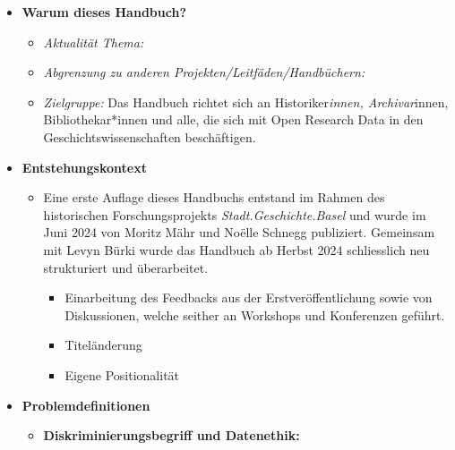 \documentclass[
  letterpaper,
  DIV=11,
  numbers=noendperiod]{scrartcl}
\providecommand{\tightlist}{%
  \setlength{\itemsep}{0pt}\setlength{\parskip}{0pt}}\usepackage{longtable,booktabs,array}
\begin{document}
\begin{itemize}
\item
  \textbf{Warum dieses Handbuch?}

  \begin{itemize}
  \tightlist
  \item
    \emph{Aktualität Thema:}
  \item
    \emph{Abgrenzung zu anderen Projekten/Leitfäden/Handbüchern:}
  \item
    \emph{Zielgruppe:} Das Handbuch richtet sich an
    Historiker\emph{innen, Archivar}innen, Bibliothekar*innen und alle,
    die sich mit Open Research Data in den Geschichtswissenschaften
    beschäftigen.
  \end{itemize}
\item
  \textbf{Entstehungskontext}

  \begin{itemize}
  \tightlist
  \item
    Eine erste Auflage dieses Handbuchs entstand im Rahmen des
    historischen Forschungsprojekts \emph{Stadt.Geschichte.Basel} und
    wurde im Juni 2024 von Moritz Mähr und Noëlle Schnegg publiziert.
    Gemeinsam mit Levyn Bürki wurde das Handbuch ab Herbst 2024
    schliesslich neu strukturiert und überarbeitet.

    \begin{itemize}
    \tightlist
    \item
      Einarbeitung des Feedbacks aus der Erstveröffentlichung sowie von
      Diskussionen, welche seither an Workshops und Konferenzen geführt.
    \item
      Titeländerung
    \item
      Eigene Positionalität
    \end{itemize}
  \end{itemize}
\item
  \textbf{Problemdefinitionen}

  \begin{itemize}
  \tightlist
  \item
    \textbf{Diskriminierungsbegriff und Datenethik:}


\end{itemize}
\end{itemize}
\end{document}
